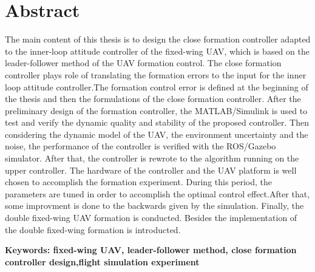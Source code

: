\vspace*{17mm}

{\let\clearpage\relax \chapter*{
  \textmd{Abstract}\vskip -3bp}}
\setcounter{page}{2}

\setlength{\parskip}{0em}

The main content of this thesis is to design the close formation controller adapted to the inner-loop attitude controller of
the fixed-wing UAV, which is based on the leader-follower method of the UAV formation control. The close formation controller
plays role of translating the formation errors to the input for the inner loop attitude controller.The formation control error
is defined at the beginning of the thesis and then the formulations of the close formation controller. After the preliminary
design of the formation controller, the MATLAB/Simulink is used to test and verify the dynamic quality and stability of the
proposed controller. Then considering the dynamic model of the  UAV, the environment uncertainty and the noise, the performance
of the controller is verified with the ROS/Gazebo simulator. After that, the controller is rewrote to the algorithm running on
the upper controller. The hardware of the controller and the UAV platform is well chosen to accomplish the formation experiment.
During this period, the parameters are tuned in order to accomplish the optimal control effect.After that, some improvment is 
done to the backwards given by the simulation.
Finally, the double fixed-wing UAV formation is conducted. Besides the implementation of the double fixed-wing formation is introducted.

\vspace{3ex}\noindent\textbf{Keywords: fixed-wing UAV, leader-follower method, close formation controller design,flight simulation experiment}
\newpage

